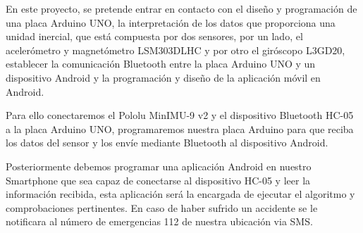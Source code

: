 		En este proyecto, se pretende entrar en contacto con el dise\~no y programación de una placa Arduino UNO, la interpretación de los datos que proporciona una unidad inercial, que está compuesta por dos sensores, por un lado, el acelerómetro y magnetómetro LSM303DLHC y por otro el giróscopo L3GD20, establecer la comunicación Bluetooth entre la placa Arduino UNO y un dispositivo Android y la programación y dise\~no de la aplicación móvil en Android.
		
		Para ello conectaremos el Pololu MinIMU-9 v2 y el dispositivo Bluetooth HC-05 a la placa Arduino UNO, programaremos nuestra placa Arduino para que reciba los datos del sensor y los envíe mediante Bluetooth al dispositivo Android.
		
		Posteriormente debemos programar una aplicación Android en nuestro Smartphone que sea capaz de conectarse al dispositivo HC-05 y leer la información recibida, esta aplicación será la encargada de ejecutar el algoritmo y comprobaciones pertinentes. En caso de haber sufrido un accidente se le notificara al número de emergencias 112 de nuestra ubicación via SMS.
		
				
	\newpage
	$\ $